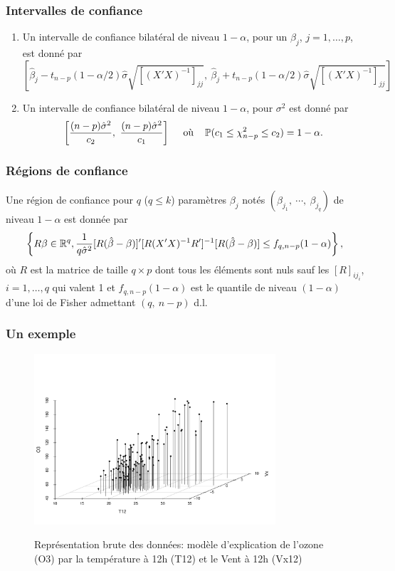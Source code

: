 \begin{frame}
\frametitle{Intervalles de confiance}
\begin{theo}
\begin{enumerate}
\item Un intervalle de confiance bilatéral de niveau $1-\alpha$,  pour un $\beta_{j}$, $j=1,\dots, p$, est donné  par
    $$
    [\hat{\beta}_{j}-t_{n-p}(1-\alpha/2)\hat{\sigma}\sqrt{[(X'X)^{-1}]_{jj}},\ \hat{\beta}_{j}+t_{n-p}(1-\alpha/2)\hat{\sigma}\sqrt{[(X'X)^{-1}]_{jj}}]
    $$
\item Un intervalle de confiance bilatéral de niveau $ 1-\alpha$, pour $\sigma^{2}$  est donné par
$$
\ccint{\frac{(n-p)\hat{\sigma}^{2}}{c_{2}},\ \frac{(n-p)\hat{\sigma}^{2}}{c_{1}}}\ \quad \text{où} \quad  \PP(c_{1}\leq\chi_{n-p}^{2}\leq c_{2})=1-\alpha.
$$
\end{enumerate}
\end{theo}
\end{frame}


\begin{frame}
\frametitle{Régions de confiance}
\begin{theo}
 Une région de confiance  pour $q$ ($q\leq k$)  param\`{e}tres $\beta_{j}$ notés $(\beta_{j_{1}},\ \cdots,\ \beta_{j_{q}})$ de niveau
 $ 1-\alpha$ est donn\'{e}e  par
$$
\left\{R\beta \in \mathbb{R}^q, \frac{1}{q\hat{\sigma}^{2}}[R(\hat{\beta}-\beta)]'[R(X'X)^{-1}R']^{-1}[R(\hat{\beta}-\beta)]\leq f_{q,n-p}(1-\alpha)\right\},
$$
o\`{u} $R$ est la matrice de taille $q\times p$ dont tous les éléments sont nuls sauf les $[R]_{ij_{i}}$, $i=1,\dots,q$ qui valent 1 et $f_{q,n-p}(1-\alpha)$ est le quantile de niveau $(1-\alpha)$ d'une loi de Fisher admettant $(q,\ n-p)$ d.l.
\end{theo}
\end{frame}

\begin{frame}
\frametitle{Un exemple}
\begin{figure}
  \centering
  \includegraphics[width=0.8\textwidth]{ScatterPlot}\\
  \caption{Représentation brute des données: modèle d'explication de l'ozone (O3) par la température à 12h (T12) et le Vent à 12h (Vx12)}
\end{figure}
\end{frame}

